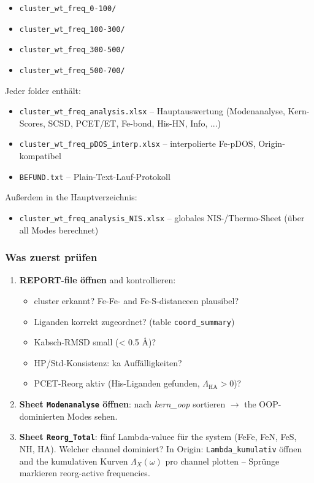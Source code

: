 \documentclass[11pt,a4paper,twoside]{article}
\theoremstyle{remark}
\begin{document}
\begin{itemize}
  \item \texttt{cluster\_wt\_freq\_0-100/}
  \item \texttt{cluster\_wt\_freq\_100-300/}
  \item \texttt{cluster\_wt\_freq\_300-500/}
  \item \texttt{cluster\_wt\_freq\_500-700/}
\end{itemize}

Jeder folder enth\"alt:

\begin{itemize}
  \item \texttt{cluster\_wt\_freq\_analysis.xlsx} -- Hauptauswertung
        (Modenanalyse, Kern-Scores, SCSD, PCET/ET, Fe-bond,
        His-HN, Info, ...)
  \item \texttt{cluster\_wt\_freq\_pDOS\_interp.xlsx} -- interpolierte
        Fe-pDOS, Origin-kompatibel
  \item \texttt{BEFUND.txt} -- Plain-Text-Lauf-Protokoll
\end{itemize}

Au\ss erdem in the Hauptverzeichnis:

\begin{itemize}
  \item \texttt{cluster\_wt\_freq\_analysis\_NIS.xlsx} -- globales NIS-/Thermo-Sheet
        (\"uber all Modes berechnet)
\end{itemize}

\subsubsection*{Was zuerst pr\"ufen}

\begin{enumerate}
  \item \textbf{REPORT-file \"offnen} and kontrollieren:
    \begin{itemize}
      \item cluster erkannt? Fe-Fe- and Fe-S-distanceen plausibel?
      \item Liganden korrekt zugeordnet?
            (table \texttt{coord\_summary})
      \item Kabsch-RMSD small (< 0.5 \AA{})?
      \item HP/Std-Konsistenz: ka Auff\"alligkeiten?
      \item PCET-Reorg aktiv (His-Liganden gefunden,
            $\Lambda_\text{HA} > 0$)?
    \end{itemize}
  \item \textbf{Sheet \texttt{Modenanalyse} \"offnen}: nach
        \emph{kern\_oop} sortieren $\to$ the OOP-dominierten Modes
        sehen.
  \item \textbf{Sheet \texttt{Reorg\_Total}}: f\"unf Lambda-valuee
        f\"ur the system (FeFe, FeN, FeS, NH, HA). Welcher channel
        dominiert? In Origin: \texttt{Lambda\_kumulativ} \"offnen
        and the kumulativen Kurven $\Lambda_X(\omega)$ pro channel
        plotten -- Spr\"unge markieren reorg-active frequencies.
\end{enumerate}
\end{document}
